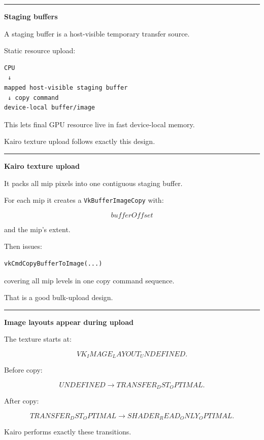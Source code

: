 \begin{center}\rule{0.5\linewidth}{0.5pt}\end{center}

\textbf{Staging buffers}

A staging buffer is a host-visible temporary transfer source.

Static resource upload:

\begin{verbatim}
CPU
 ↓
mapped host-visible staging buffer
 ↓ copy command
device-local buffer/image
\end{verbatim}

This lets final GPU resource live in fast device-local memory.

Kairo texture upload follows exactly this design.

\begin{center}\rule{0.5\linewidth}{0.5pt}\end{center}

\textbf{Kairo texture upload}

It packs all mip pixels into one contiguous staging buffer.

For each mip it creates a \texttt{VkBufferImageCopy} with:

\[
bufferOffset
\]

and the mip's extent.

Then issues:

\begin{verbatim}
vkCmdCopyBufferToImage(...)
\end{verbatim}

covering all mip levels in one copy command sequence.

That is a good bulk-upload design.

\begin{center}\rule{0.5\linewidth}{0.5pt}\end{center}

\textbf{Image layouts appear during upload}

The texture starts at:

\[
VK_IMAGE_LAYOUT_UNDEFINED.
\]

Before copy:

\[
\boxed{
UNDEFINED
\rightarrow
TRANSFER_DST_OPTIMAL.
}
\]

After copy:

\[
\boxed{
TRANSFER_DST_OPTIMAL
\rightarrow
SHADER_READ_ONLY_OPTIMAL.
}
\]

Kairo performs exactly these transitions.


